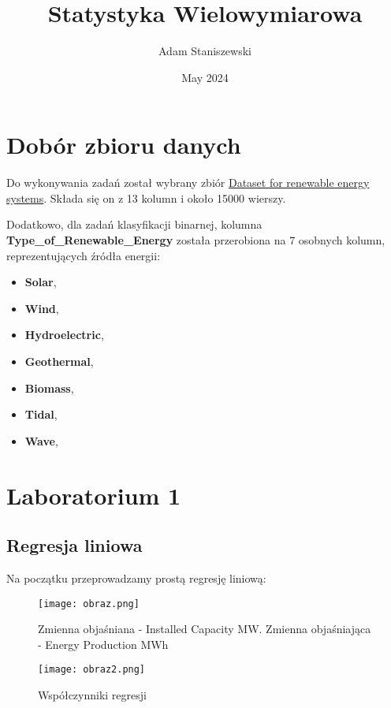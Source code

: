 \documentclass{article}
\title{Statystyka Wielowymiarowa}
\author{Adam Staniszewski}
\date{May 2024}
\begin{document}
\maketitle

\tableofcontents  %

\section{Dobór zbioru danych}
Do wykonywania zadań został wybrany zbiór \href{https://www.kaggle.com/datasets/girumwondemagegn/dataset-for-renewable-energy-systems}{Dataset for renewable energy systems}. Składa się on z 13 kolumn i około 15000 wierszy. 

Dodatkowo, dla zadań klasyfikacji binarnej, kolumna \textbf{Type\_of\_Renewable\_Energy} została przerobiona na 7 osobnych kolumn, reprezentujących źródła energii:
\begin{itemize}
    \item \textbf{Solar},
    \item \textbf{Wind},
    \item \textbf{Hydroelectric},
    \item \textbf{Geothermal},
    \item \textbf{Biomass},
    \item \textbf{Tidal},
    \item \textbf{Wave},
\end{itemize}

\section{Laboratorium 1}
\subsection{Regresja liniowa}
Na początku przeprowadzamy prostą regresję liniową:

\begin{figure}[H]
    \centering
    \texttt{[image: obraz.png]}
    \caption{Zmienna objaśniana - Installed Capacity MW. Zmienna objaśniająca - Energy Production MWh}
    \label{fig:regression}
\end{figure}

\begin{figure}[H]
    \centering
    \texttt{[image: obraz2.png]}
    \caption{Współczynniki regresji}
    \label{fig:coefficients}
\end{figure}
\end{document}
